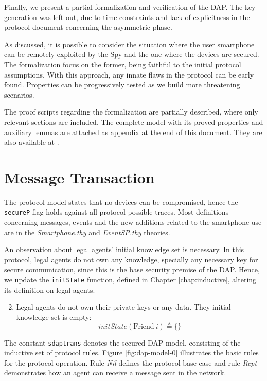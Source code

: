 \label{chap:verification}
Finally, we present a partial formalization and verification of the DAP\@. The key generation was left out, due to time constraints and lack of explicitness in the protocol document concerning the asymmetric phase.

As discussed, it is possible to consider the situation where the user smartphone can be remotely exploited by the Spy and the one where the devices are secured. The formalization focus on the former, being faithful to the initial protocol assumptions. With this approach, any innate flaws in the protocol can be early found. Properties can be progressively tested as we build more threatening scenarios.

The proof scripts regarding the formalization are partially described, where only relevant sections are included. The complete model with its proved properties and auxiliary lemmas are attached as appendix at the end of this document. They are also available at \cite{RodopoulosGithub}.

\section{Message Transaction}
The protocol model states that no devices can be compromised, hence the \texttt{secureP} flag holds against all protocol possible traces. Most definitions concerning messages, events and the new additions related to the smartphone use are in the \textit{Smartphone.thy} and \textit{EventSP.thy} theories.

An observation about legal agents' initial knowledge set is necessary. In this protocol, legal agents do not own any knowledge, specially any necessary key for secure communication, since this is the base security premise of the DAP. Hence, we update the \texttt{initState} function, defined in Chapter \ref{chap:inductive}, altering its definition on legal agents.

\begin{enumerate}
  \setcounter{enumi}{1}

  \item Legal agents do not own their private keys or any data. They initial knowledge set is empty:
  \begin{equation*}
    initState (\text{Friend} \ i) \triangleq \{\}
  \end{equation*}
\end{enumerate}

The constant \texttt{sdaptrans} denotes the secured DAP model, consisting of the inductive set of protocol rules. Figure \ref{fig:dap-model-0} illustrates the basic rules for the protocol operation. Rule \textit{Nil} defines the protocol base case and rule \textit{Rcpt} demonstrates how an agent can receive a message sent in the network.

